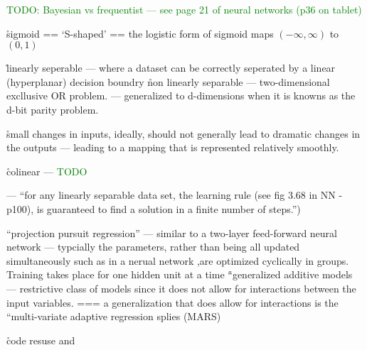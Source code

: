 \textcolor{green}{TODO: Bayesian vs frequentist --- see page 21 of neural networks (p36 on tablet)}

\r{sigmoid == `S-shaped' == the logistic form of sigmoid maps $(-\infty, \infty)$ to $(0, 1)$}

\r{linearly seperable --- where a dataset can be correctly seperated by a linear (hyperplanar) decision boundry}
\r{non linearly separable --- two-dimensional excllusive OR problem. --- generalized to d-dimensions when it is knowns as the d-bit parity problem.}

\r{small changes in inputs, ideally, should not generally lead to dramatic changes in the outputs --- leading to a mapping that is represented relatively smoothly.}

\r{colinear --- \textcolor{green}{TODO}}


\r{ --- ``for any linearly separable data set, the learning rule (see fig 3.68 in NN - p100), is guaranteed to find a solution in a finite number of steps.'')}


\r{``projection pursuit regression'' --- similar to a two-layer feed-forward neural network --- typcially the parameters, rather than being all updated simultaneously such as in a nerual network ,are optimized cyclically in groups. Training takes place for one hidden unit at a time}
\r{``generalized additive models  --- restrictive class of models since it does not allow for interactions between the input variables. === a generalization that does allow for interactions is the ``multi-variate adaptive regression splies (MARS) }









\r{code resuse and }